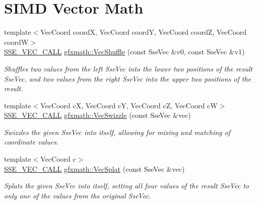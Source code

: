 \hypertarget{group___s_i_m_d_vec_math}{}\section{S\+I\+M\+D Vector Math}
\label{group___s_i_m_d_vec_math}
\begin{DoxyCompactItemize}
\item 
{\footnotesize template$<$Vec\+Coord coord\+X, Vec\+Coord coord\+Y, Vec\+Coord coord\+Z, Vec\+Coord coord\+W$>$ }\\\hyperlink{ssevec__math__defs_8h_a97454f977a5281455cecacce1e8ba670}{S\+S\+E\+\_\+\+V\+E\+C\+\_\+\+C\+A\+L\+L} \hyperlink{group___s_i_m_d_vec_math_gae8f78c3f4bb12afec4debb58bb9b9643}{gfxmath\+::\+Vec\+Shuffle} (const Sse\+Vec \&v0, const Sse\+Vec \&v1)
\begin{DoxyCompactList}\small\item\em Shuffles two values from the left Sse\+Vec into the lower two positions of the result Sse\+Vec, and two values from the right Sse\+Vec into the upper two positions of the result. \end{DoxyCompactList}\item 
{\footnotesize template$<$Vec\+Coord c\+X, Vec\+Coord c\+Y, Vec\+Coord c\+Z, Vec\+Coord c\+W$>$ }\\\hyperlink{ssevec__math__defs_8h_a97454f977a5281455cecacce1e8ba670}{S\+S\+E\+\_\+\+V\+E\+C\+\_\+\+C\+A\+L\+L} \hyperlink{group___s_i_m_d_vec_math_ga6a071d88e0f11c5a9f5b1283ed8f3ec2}{gfxmath\+::\+Vec\+Swizzle} (const Sse\+Vec \&vec)
\begin{DoxyCompactList}\small\item\em Swizzles the given Sse\+Vec into itself, allowing for mixing and matching of coordinate values. \end{DoxyCompactList}\item 
{\footnotesize template$<$Vec\+Coord c$>$ }\\\hyperlink{ssevec__math__defs_8h_a97454f977a5281455cecacce1e8ba670}{S\+S\+E\+\_\+\+V\+E\+C\+\_\+\+C\+A\+L\+L} \hyperlink{group___s_i_m_d_vec_math_gae0bf083e25adfecef9647164299dc9be}{gfxmath\+::\+Vec\+Splat} (const Sse\+Vec \&vec)
\begin{DoxyCompactList}\small\item\em Splats the given Sse\+Vec into itself, setting all four values of the result Sse\+Vec to only one of the values from the original Sse\+Vec. \end{DoxyCompactList}\item 

\end{DoxyCompactItemize}
